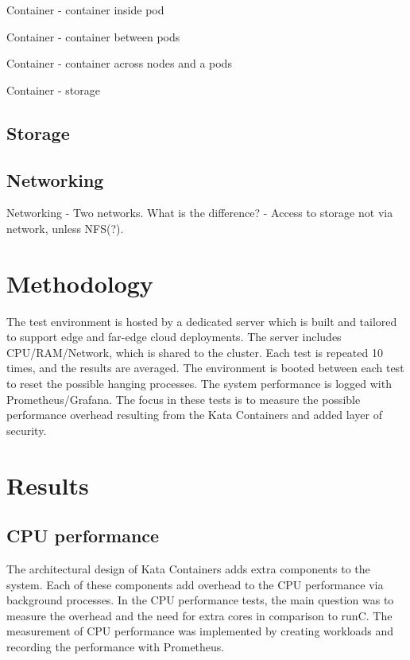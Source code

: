 Container - container inside pod

Container - container between pods

Container - container across nodes and a pods

Container - storage

\subsection{Storage}



\subsection{Networking}

Networking
    - Two networks. What is the difference?
    - Access to storage not via network, unless NFS(?).













\section{Methodology}

The test environment is hosted by a dedicated server which is built and tailored to support edge and far-edge cloud deployments. The server includes CPU/RAM/Network, which is shared to the cluster. Each test is repeated 10 times, and the results are averaged. The environment is booted between each test to reset the possible hanging processes. The system performance is logged with Prometheus/Grafana. The focus in these tests is to measure the possible performance overhead resulting from the Kata Containers and added layer of security.

\section{Results}

\subsection{CPU performance}

The architectural design of Kata Containers adds extra components to the system. Each of these components add overhead to the CPU performance via background processes. In the CPU performance tests, the main question was to measure the overhead and the need for extra cores in comparison to runC. The measurement of CPU performance was implemented by creating workloads and recording the performance with Prometheus. 

